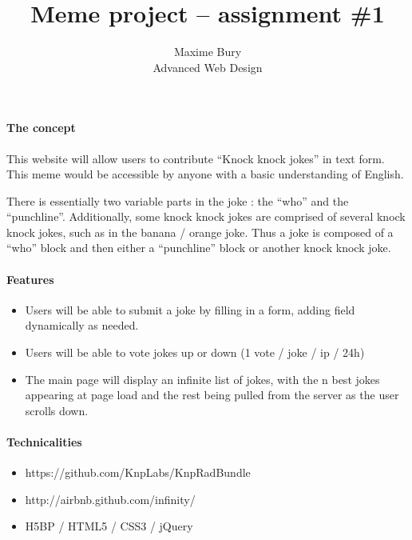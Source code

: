\documentclass[12pt]{article}
\begin{document}

\title{Meme project -- assignment \#1}%
\author{Maxime Bury\\ %
Advanced Web Design} %

\maketitle

\paragraph{The concept} %
\label{par:the_concept}
This website will allow users to contribute \enquote{Knock knock jokes} in text form. This meme would be accessible by anyone with a basic understanding of English. 

There is essentially two variable parts in the joke : the \enquote{who} and the \enquote{punchline}. Additionally, some knock knock jokes are comprised of several knock knock jokes, such as in the banana / orange joke. Thus a joke is composed of a \enquote{who} block and then either a \enquote{punchline} block or another knock knock joke.

\paragraph{Features} %
\label{par:features}
\begin{itemize}
    \item Users will be able to submit a joke by filling in a form, adding field dynamically as needed.
    \item Users will be able to vote jokes up or down (1 vote / joke / ip / 24h)
    \item The main page will display an infinite list of jokes, with the n best jokes appearing at page load and the rest being pulled from the server as the user scrolls down.
\end{itemize}

\paragraph{Technicalities} %
\label{par:technicalities}
\begin{itemize}
    \item https://github.com/KnpLabs/KnpRadBundle
    \item http://airbnb.github.com/infinity/
    \item H5BP / HTML5 / CSS3 / jQuery
\end{itemize}
\end{document}
